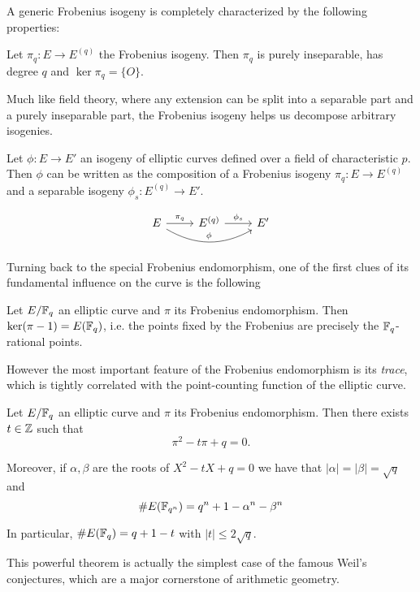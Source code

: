 A generic Frobenius isogeny is completely characterized by the following properties:
\begin{proposition}
    Let $\pi_q:E\to E^{(q)}$ the Frobenius isogeny. Then $\pi_q$ is purely inseparable, has degree $q$ and $\ker\pi_q = \{O\}$.
\end{proposition}

Much like field theory, where any extension can be split into a separable part and a purely inseparable part, the Frobenius isogeny helps us decompose arbitrary isogenies.
\begin{proposition}
    Let $\phi: E\to E'$ an isogeny of elliptic curves defined over a field of characteristic $p$. Then $\phi$ can be written as the composition of a Frobenius isogeny $\pi_q:E\to E^{(q)}$ and a separable isogeny $\phi_s:E^{(q)}\to E'$.
    
    \[\begin{tikzcd}
        E\rar["\pi_q"] \ar[rr, bend right, "\phi"] & E^{(q)} \rar["\phi_s"] & E'
    \end{tikzcd}\]
\end{proposition}


Turning back to the special Frobenius endomorphism, one of the first clues of its fundamental influence on the curve is the following
\begin{proposition}
    Let $E/\mathbb{F}_q$ an elliptic curve and $\pi$ its Frobenius endomorphism. Then $\ker(\pi-1) = E(\mathbb{F}_q)$, i.e. the points fixed by the Frobenius are precisely the $\mathbb{F}_q$-rational points.
\end{proposition}



However the most important feature of the Frobenius endomorphism is its \emph{trace}, which is tightly correlated with the point-counting function of the elliptic curve.

\begin{theorem}
    Let $E/\mathbb{F}_q$ an elliptic curve and $\pi$ its Frobenius endomorphism. Then there exists $t\in\mathbb{Z}$ such that $$\pi^2-t\pi+q=0.$$
    
    Moreover, if $\alpha,\beta$ are the roots of $X^2-tX+q=0$ we have that $|\alpha|=|\beta|=\sqrt q$ and $$\# E(\mathbb{F}_{q^n}) = q^n+1-\alpha^n-\beta^n$$
    
    In particular, $\# E(\mathbb{F}_q) = q+1-t$ with $|t|\le2\sqrt q$.
\end{theorem}

This powerful theorem is actually the simplest case of the famous Weil's conjectures, which are a major cornerstone of arithmetic geometry.

